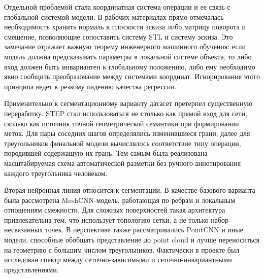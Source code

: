 Отдельной проблемой стала координатная система операции и ее связь с глобальной системой модели. В рабочих материалах прямо отмечалась необходимость хранить нормаль к плоскости эскиза либо матрицу поворота и смещение, позволяющие сопоставить систему STL и систему эскиза. Это замечание отражает важную теорему инженерного машинного обучения: если модель должна предсказывать параметры в локальной системе объекта, то либо вход должен быть инвариантен к глобальному положению, либо ему необходимо явно сообщить преобразование между системами координат. Игнорирование этого принципа ведет к резкому падению качества регрессии.

Применительно к сегментационному варианту датасет претерпел существенную переработку. STEP стал использоваться не столько как прямой вход для сети, сколько как источник точной геометрической семантики при формировании меток. Для пары соседних шагов определялись изменившиеся грани; далее для треугольников финальной модели вычислялось соответствие типу операции, породившей содержащую их грань. Тем самым была реализована масштабируемая схема автоматической разметки без ручного аннотирования каждого треугольника человеком.

Вторая нейронная линия относится к сегментации. В качестве базового варианта была рассмотрена MeshCNN-модель, работающая по ребрам и локальным отношениям смежности. Для сложных поверхностей такая архитектура привлекательна тем, что использует топологию сетки, а не только набор несвязанных точек. В перспективе также рассматривались PointCNN и иные модели, способные обобщать представление до point cloud и лучше переноситься на геометрию с большим числом треугольников. Фактически в проекте был исследован спектр между сеточно-зависимыми и сеточно-инвариантными представлениями.

